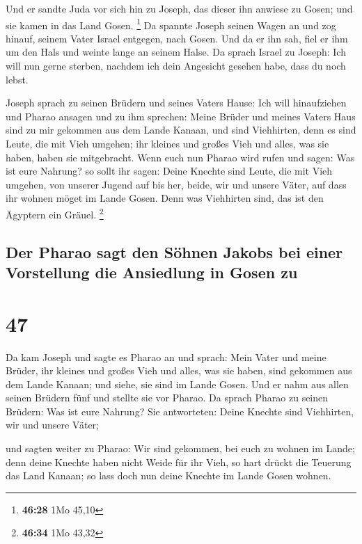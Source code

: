  Und er sandte Juda vor sich hin zu Joseph, das dieser
ihn anwiese zu Gosen; und sie kamen in das Land Gosen. \footnote{\textbf{46:28}
  1Mo 45,10}  Da spannte Joseph seinen Wagen an und zog
hinauf, seinem Vater Israel entgegen, nach Gosen. Und da er ihn sah,
fiel er ihm um den Hals und weinte lange an seinem Halse.
 Da sprach Israel zu Joseph: Ich will nun gerne sterben,
nachdem ich dein Angesicht gesehen habe, dass du noch lebst.

 Joseph sprach zu seinen Brüdern und seines Vaters Hause:
Ich will hinaufziehen und Pharao ansagen und zu ihm sprechen: Meine
Brüder und meines Vaters Haus sind zu mir gekommen aus dem Lande Kanaan,
 und sind Viehhirten, denn es sind Leute, die mit Vieh
umgehen; ihr kleines und großes Vieh und alles, was sie haben, haben sie
mitgebracht.  Wenn euch nun Pharao wird rufen und sagen:
Was ist eure Nahrung?  so sollt ihr sagen: Deine Knechte
sind Leute, die mit Vieh umgehen, von unserer Jugend auf bis her, beide,
wir und unsere Väter, auf dass ihr wohnen möget im Lande Gosen. Denn was
Viehhirten sind, das ist den Ägyptern ein Gräuel. \footnote{\textbf{46:34}
  1Mo 43,32}

\hypertarget{der-pharao-sagt-den-suxf6hnen-jakobs-bei-einer-vorstellung-die-ansiedlung-in-gosen-zu}{%
\subsection{Der Pharao sagt den Söhnen Jakobs bei einer Vorstellung die
Ansiedlung in Gosen
zu}\label{der-pharao-sagt-den-suxf6hnen-jakobs-bei-einer-vorstellung-die-ansiedlung-in-gosen-zu}}

\hypertarget{section-46}{%
\section{47}\label{section-46}}

 Da kam Joseph und sagte es Pharao an und sprach: Mein
Vater und meine Brüder, ihr kleines und großes Vieh und alles, was sie
haben, sind gekommen aus dem Lande Kanaan; und siehe, sie sind im Lande
Gosen.  Und er nahm aus allen seinen Brüdern fünf und
stellte sie vor Pharao.  Da sprach Pharao zu seinen
Brüdern: Was ist eure Nahrung? Sie antworteten: Deine Knechte sind
Viehhirten, wir und unsere Väter;

 und sagten weiter zu Pharao: Wir sind gekommen, bei euch
zu wohnen im Lande; denn deine Knechte haben nicht Weide für ihr Vieh,
so hart drückt die Teuerung das Land Kanaan; so lass doch nun deine
Knechte im Lande Gosen wohnen.

